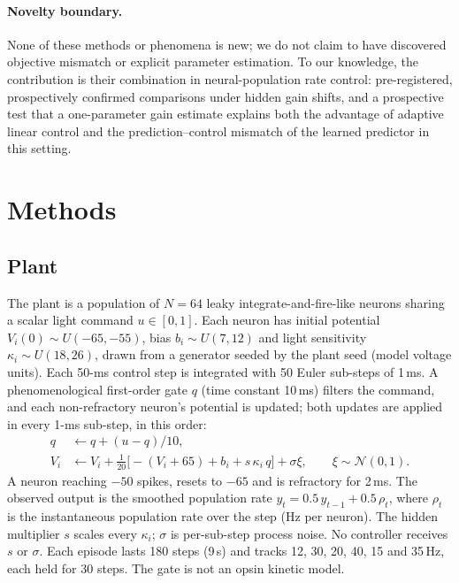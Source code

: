 \documentclass[11pt]{article}
\newcommand{\Hz}{\,Hz}
\begin{document}
\paragraph{Novelty boundary.} None of these methods or phenomena is new; we do not claim to have discovered objective mismatch or explicit parameter estimation. To our knowledge, the contribution is their combination in neural-population rate control: pre-registered, prospectively confirmed comparisons under hidden gain shifts, and a prospective test that a one-parameter gain estimate explains both the advantage of adaptive linear control and the prediction--control mismatch of the learned predictor in this setting.

\section{Methods}
\subsection{Plant}
The plant is a population of $N=64$ leaky integrate-and-fire-like neurons sharing a scalar light command $u\in[0,1]$. Each neuron has initial potential $V_i(0)\sim U(-65,-55)$, bias $b_i\sim U(7,12)$ and light sensitivity $\kappa_i\sim U(18,26)$, drawn from a generator seeded by the plant seed (model voltage units). Each 50-ms control step is integrated with 50 Euler sub-steps of 1\,ms. A phenomenological first-order gate $q$ (time constant 10\,ms) filters the command, and each non-refractory neuron's potential is updated; both updates are applied in every 1-ms sub-step, in this order:
\begin{align}
q &\leftarrow q + (u-q)/10,\\
V_i &\leftarrow V_i + \tfrac{1}{20}\big[-(V_i+65) + b_i + s\,\kappa_i\, q\big] + \sigma\xi,\qquad \xi\sim\mathcal N(0,1).
\end{align}
A neuron reaching $-50$ spikes, resets to $-65$ and is refractory for 2\,ms. The observed output is the smoothed population rate $y_t=0.5\,y_{t-1}+0.5\,\rho_t$, where $\rho_t$ is the instantaneous population rate over the step (Hz per neuron). The hidden multiplier $s$ scales every $\kappa_i$; $\sigma$ is per-sub-step process noise. No controller receives $s$ or $\sigma$. Each episode lasts 180 steps (9\,s) and tracks 12, 30, 20, 40, 15 and 35\Hz, each held for 30 steps. The gate is not an opsin kinetic model.
\end{document}
